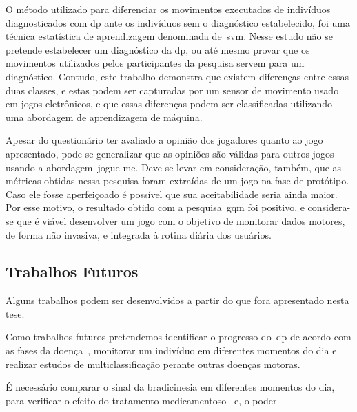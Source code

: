 O método utilizado para diferenciar os movimentos executados de indivíduos diagnosticados com \ac{dp} ante os indivíduos sem o diagnóstico estabelecido, foi uma técnica estatística de aprendizagem denominada de~\ac{svm}. Nesse estudo não se pretende estabelecer um diagnóstico da \ac{dp}, ou até mesmo provar que os movimentos utilizados pelos participantes da pesquisa servem para um diagnóstico. Contudo, este trabalho demonstra que existem diferenças entre essas duas classes, e estas podem ser capturadas por um sensor de movimento usado em jogos eletrônicos, e que essas diferenças podem ser classificadas utilizando uma abordagem de aprendizagem de máquina. 

Apesar do questionário ter avaliado a opinião dos jogadores quanto ao jogo apresentado, pode-se generalizar que as opiniões são válidas para outros jogos usando a abordagem~\ac{jogue-me}. Deve-se levar em consideração, também, que as métricas obtidas nessa pesquisa foram extraídas de um jogo na fase de protótipo. Caso ele fosse aperfeiçoado é possível que sua aceitabilidade seria ainda maior. Por esse motivo, o resultado obtido com a pesquisa~\ac{gqm} foi positivo, e considera-se que é viável desenvolver um jogo com o objetivo de monitorar dados motores, de forma não invasiva, e integrada à rotina diária dos usuários.


\subsection{Trabalhos Futuros}\label{sec:trab_futuros}

Alguns trabalhos podem ser desenvolvidos a partir do que fora apresentado nesta tese.

Como trabalhos futuros pretendemos identificar o progresso do~\ac{dp} de acordo com as fases da doença~\cite{protpar010}, monitorar um indivíduo em diferentes momentos do dia e realizar estudos de multiclassificação perante outras doenças motoras.

É necessário comparar o sinal da bradicinesia em diferentes momentos do dia, para verificar o efeito do tratamento medicamentoso~\cite{protpar010} e, o poder 



